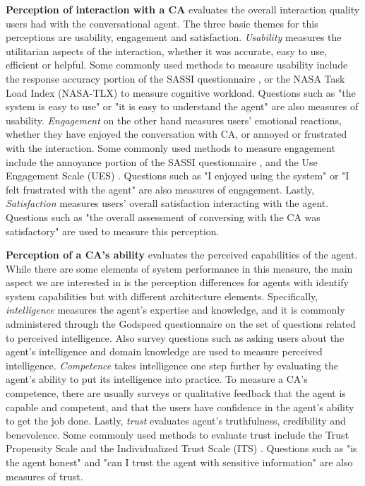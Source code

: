 \documentclass[sigconf,screen,review, anonymous]{acmart}
\newcommand{\cmt}[1]{}%
\begin{document}
\textbf{Perception of interaction with a CA} evaluates the overall interaction quality users had with the conversational agent. The three basic themes for this perceptions are usability, engagement and satisfaction. \textit{Usability} measures the utilitarian aspects of the interaction, whether it was accurate, easy to use, efficient or helpful. Some commonly used methods to measure usability include the response accuracy portion of the SASSI questionnaire \cite{hone2000towards}\cmt{sassi}, or the NASA Task Load Index (NASA-TLX) \cite{hart1988development}\cmt{nasa} to measure cognitive workload. Questions such as "the system is easy to use" or "it is easy to understand the agent" are also measures of usability. \textit{Engagement} on the other hand measures users' emotional reactions, whether they have enjoyed the conversation with CA, or annoyed or frustrated with the interaction. Some commonly used methods to measure engagement include  the annoyance portion of the SASSI questionnaire \cite{hone2000towards}\cmt{sassi}, and the Use Engagement Scale (UES) \cite{o2018practical}\cmt{ues}. Questions such as "I enjoyed using the system" or "I felt frustrated with the agent" are also measures of engagement. Lastly, \textit{Satisfaction} measures users' overall satisfaction interacting with the agent. Questions such as "the overall assessment of conversing with the CA was satisfactory" are used to measure this perception.

\textbf{Perception of a CA's ability} evaluates the perceived capabilities of the agent. While there are some elements of system performance in this measure, the main aspect we are interested in is the perception differences for agents with identify system capabilities but with different architecture elements. Specifically, \textit{intelligence} measures the agent's expertise and knowledge, and it is commonly administered through the Godspeed questionnaire \cite{bartneck2009measurement}\cmt{godspeed} on the set of questions related to perceived intelligence. Also survey questions such as asking users about the agent's intelligence and domain knowledge are used to measure perceived intelligence. \textit{Competence} takes intelligence one step further by evaluating the agent's ability to put its intelligence into practice. To measure a CA's competence, there are usually surveys or qualitative feedback that the agent is capable and competent, and that the users have confidence in the agent's ability to get the job done. Lastly, \textit{trust} evaluates agent's truthfulness, credibility and benevolence. Some commonly used methods to evaluate trust include the Trust Propensity Scale \cite{mayer1999effect} and the Individualized Trust Scale (ITS) \cite{wheeless1977measurement}. Questions such as "is the agent honest" and "can I trust the agent with sensitive information" are also measures of trust.
\end{document}

